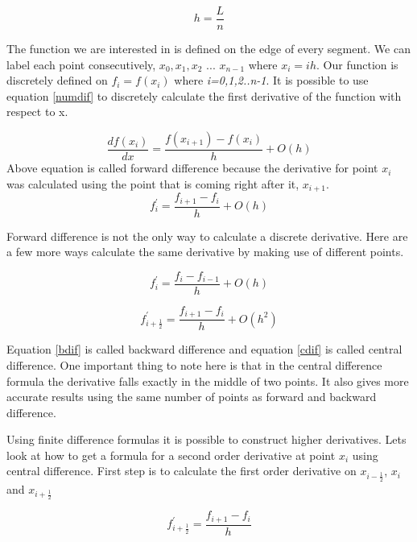 \begin{equation}
h=\frac{L}{n}
\end{equation}

The function we are interested in is defined on the edge of every segment. We can label each point consecutively, $x_0,x_1,x_2$ ... $x_{n-1}$ where $x_i=ih$. Our function is discretely defined on \textit{$f_{i}=f(x_{i})$} where\textit{ i=0,1,2..n-1}. It is possible to use equation  \ref{numdif} to discretely calculate the first derivative of the function with respect to x.

\begin{equation}
\frac{df(x_i)}{dx}=\frac{f(x_{i+1})-f(x_i)}{h} + O(h)
\end{equation}
Above equation is called forward difference because the derivative for point $x_i$ was calculated using the point that is coming right after it, $x_{i+1}$.
\begin{equation}
f^{'}_i=\frac{f_{i+1}-f_i}{h}+ O(h)
\end{equation}

Forward difference is not the only way to calculate a discrete derivative. Here are a few more ways calculate the same derivative by making use of different points.

\begin{equation}
f^{'}_i=\frac{f_{i}-f_{i-1}}{h}+ O(h)
\label{bdif}
\end{equation}

\begin{equation}
f^{'}_{i+\frac{1}{2}}=\frac{f_{i+1}-f_i}{h}+ O(h^2)
\label{cdif}
\end{equation}

Equation \ref{bdif} is called backward difference and equation \ref{cdif} is called central difference. One important thing to note here is that in the central difference formula the derivative falls exactly in the middle of two points. It also gives more accurate results using the same number of points as forward and backward difference. 

Using finite difference formulas it is possible to construct higher derivatives. Lets look at how to get a formula for a second order derivative at point $x_i$ using central difference. First step is to calculate the first order derivative on $x_{i-\frac{1}{2}}$, $x_i$ and $x_{i+\frac{1}{2}}$  

\begin{equation}
f_{i+\frac{1}{2}}^{'}=\frac{f_{i+1}-f_{i}}{h}
\label{forwardd}
\end{equation}

